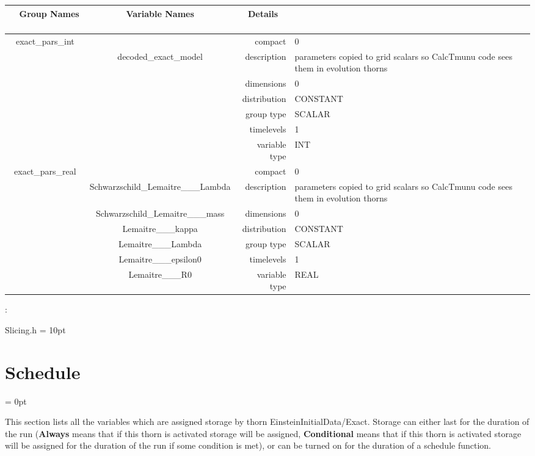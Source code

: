 \begin{tabular*}{150mm}{|c|c@{\extracolsep{\fill}}|rl|} \hline 
~ {\bf Group Names} ~ & ~ {\bf Variable Names} ~  &{\bf Details} ~ & ~\\ 
\hline 
exact\_pars\_int &  & compact & 0 \\ 
 & decoded\_exact\_model & description & parameters copied to grid scalars so CalcTmunu code sees them in evolution thorns \\ 
 &  & dimensions & 0 \\ 
 &  & distribution & CONSTANT \\ 
 &  & group type & SCALAR \\ 
 &  & timelevels & 1 \\ 
 &  & variable type & INT \\ 
\hline 
exact\_pars\_real &  & compact & 0 \\ 
 & Schwarzschild\_Lemaitre\_\_\_Lambda & description & parameters copied to grid scalars so CalcTmunu code sees them in evolution thorns \\ 
 & Schwarzschild\_Lemaitre\_\_\_mass & dimensions & 0 \\ 
 & Lemaitre\_\_\_kappa & distribution & CONSTANT \\ 
 & Lemaitre\_\_\_Lambda & group type & SCALAR \\ 
 & Lemaitre\_\_\_epsilon0 & timelevels & 1 \\ 
 & Lemaitre\_\_\_R0 & variable type & REAL \\ 
\hline 
\end{tabular*} 



\vspace{5mm}

: 

Slicing.h
\vspace{2mm}\parskip = 10pt 

\section{Schedule} 


\parskip = 0pt


\noindent This section lists all the variables which are assigned storage by thorn EinsteinInitialData/Exact.  Storage can either last for the duration of the run ({\bf Always} means that if this thorn is activated storage will be assigned, {\bf Conditional} means that if this thorn is activated storage will be assigned for the duration of the run if some condition is met), or can be turned on for the duration of a schedule function.



